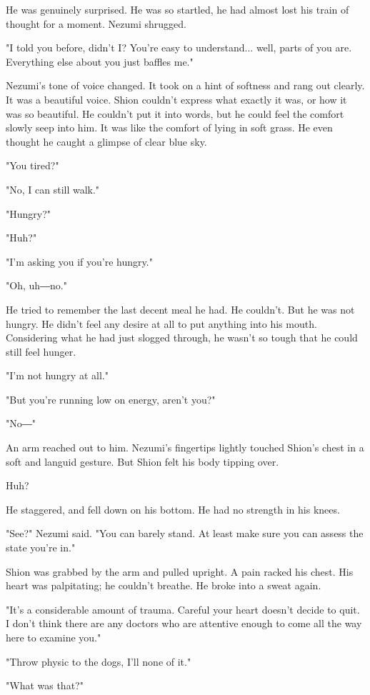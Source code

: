 He was genuinely surprised. He was so startled, he had almost lost his
train of thought for a moment. Nezumi shrugged.

"I told you before, didn't I? You're easy to understand... well, parts
of you are. Everything else about you just baffles me."

Nezumi's tone of voice changed. It took on a hint of softness and rang
out clearly. It was a beautiful voice. Shion couldn't express what
exactly it was, or how it was so beautiful. He couldn't put it into
words, but he could feel the comfort slowly seep into him. It was like
the comfort of lying in soft grass. He even thought he caught a glimpse
of clear blue sky.

"You tired?"

"No, I can still walk."

"Hungry?"

"Huh?"

"I'm asking you if you're hungry."

"Oh, uh―no."

He tried to remember the last decent meal he had. He couldn't. But he
was not hungry. He didn't feel any desire at all to put anything into
his mouth. Considering what he had just slogged through, he wasn't so
tough that he could still feel hunger.

"I'm not hungry at all."

"But you're running low on energy, aren't you?"

"No―"

An arm reached out to him. Nezumi's fingertips lightly touched Shion's
chest in a soft and languid gesture. But Shion felt his body tipping
over.

Huh?

He staggered, and fell down on his bottom. He had no strength in his
knees.

"See?" Nezumi said. "You can barely stand. At least make sure you can
assess the state you're in."

Shion was grabbed by the arm and pulled upright. A pain racked his
chest. His heart was palpitating; he couldn't breathe. He broke into a
sweat again.

"It's a considerable amount of trauma. Careful your heart doesn't decide
to quit. I don't think there are any doctors who are attentive enough to
come all the way here to examine you."

"Throw physic to the dogs, I'll none of it."

"What was that?"

